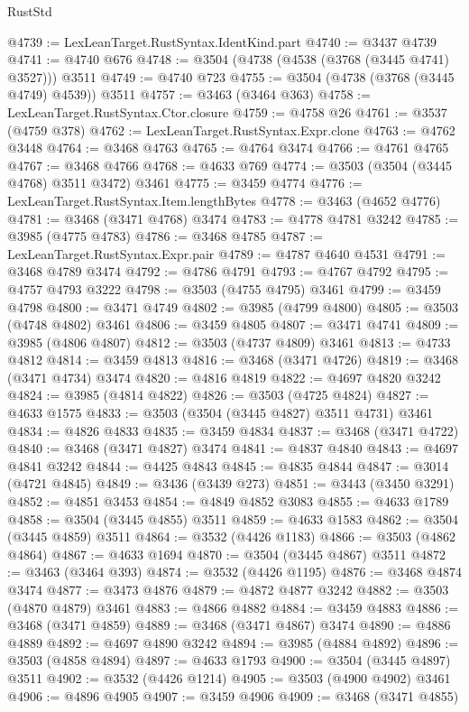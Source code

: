 \begin{lexlean}{RustStd}
\begin{coremodule}
@4739 := LexLeanTarget.RustSyntax.IdentKind.part
@4740 := @3437 @4739
@4741 := @4740 @676
@4748 := @3504 (@4738 (@4538 (@3768 (@3445 @4741) @3527))) @3511
@4749 := @4740 @723
@4755 := @3504 (@4738 (@3768 (@3445 @4749) @4539)) @3511
@4757 := @3463 (@3464 @363)
@4758 := LexLeanTarget.RustSyntax.Ctor.closure
@4759 := @4758 @26
@4761 := @3537 (@4759 @378)
@4762 := LexLeanTarget.RustSyntax.Expr.clone
@4763 := @4762 @3448
@4764 := @3468 @4763
@4765 := @4764 @3474
@4766 := @4761 @4765
@4767 := @3468 @4766
@4768 := @4633 @769
@4774 := @3503 (@3504 (@3445 @4768) @3511 @3472) @3461
@4775 := @3459 @4774
@4776 := LexLeanTarget.RustSyntax.Item.lengthBytes
@4778 := @3463 (@4652 @4776)
@4781 := @3468 (@3471 @4768) @3474
@4783 := @4778 @4781 @3242
@4785 := @3985 (@4775 @4783)
@4786 := @3468 @4785
@4787 := LexLeanTarget.RustSyntax.Expr.pair
@4789 := @4787 @4640 @4531
@4791 := @3468 @4789 @3474
@4792 := @4786 @4791
@4793 := @4767 @4792
@4795 := @4757 @4793 @3222
@4798 := @3503 (@4755 @4795) @3461
@4799 := @3459 @4798
@4800 := @3471 @4749
@4802 := @3985 (@4799 @4800)
@4805 := @3503 (@4748 @4802) @3461
@4806 := @3459 @4805
@4807 := @3471 @4741
@4809 := @3985 (@4806 @4807)
@4812 := @3503 (@4737 @4809) @3461
@4813 := @4733 @4812
@4814 := @3459 @4813
@4816 := @3468 (@3471 @4726)
@4819 := @3468 (@3471 @4734) @3474
@4820 := @4816 @4819
@4822 := @4697 @4820 @3242
@4824 := @3985 (@4814 @4822)
@4826 := @3503 (@4725 @4824)
@4827 := @4633 @1575
@4833 := @3503 (@3504 (@3445 @4827) @3511 @4731) @3461
@4834 := @4826 @4833
@4835 := @3459 @4834
@4837 := @3468 (@3471 @4722)
@4840 := @3468 (@3471 @4827) @3474
@4841 := @4837 @4840
@4843 := @4697 @4841 @3242
@4844 := @4425 @4843
@4845 := @4835 @4844
@4847 := @3014 (@4721 @4845)
@4849 := @3436 (@3439 @273)
@4851 := @3443 (@3450 @3291)
@4852 := @4851 @3453
@4854 := @4849 @4852 @3083
@4855 := @4633 @1789
@4858 := @3504 (@3445 @4855) @3511
@4859 := @4633 @1583
@4862 := @3504 (@3445 @4859) @3511
@4864 := @3532 (@4426 @1183)
@4866 := @3503 (@4862 @4864)
@4867 := @4633 @1694
@4870 := @3504 (@3445 @4867) @3511
@4872 := @3463 (@3464 @393)
@4874 := @3532 (@4426 @1195)
@4876 := @3468 @4874 @3474
@4877 := @3473 @4876
@4879 := @4872 @4877 @3242
@4882 := @3503 (@4870 @4879) @3461
@4883 := @4866 @4882
@4884 := @3459 @4883
@4886 := @3468 (@3471 @4859)
@4889 := @3468 (@3471 @4867) @3474
@4890 := @4886 @4889
@4892 := @4697 @4890 @3242
@4894 := @3985 (@4884 @4892)
@4896 := @3503 (@4858 @4894)
@4897 := @4633 @1793
@4900 := @3504 (@3445 @4897) @3511
@4902 := @3532 (@4426 @1214)
@4905 := @3503 (@4900 @4902) @3461
@4906 := @4896 @4905
@4907 := @3459 @4906
@4909 := @3468 (@3471 @4855)

\end{coremodule}
\end{lexlean}
